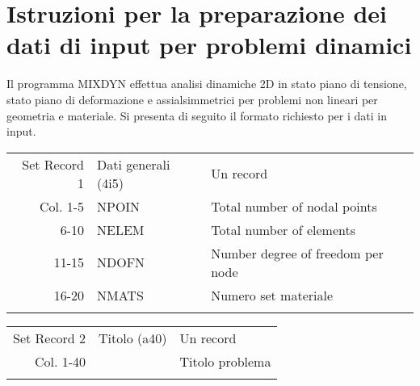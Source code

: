 \appendix
\chapter{Istruzioni per la preparazione dei dati di input per problemi dinamici }
Il programma MIXDYN effettua analisi dinamiche 2D in stato piano di tensione, stato piano di deformazione e assialsimmetrici per problemi non lineari per geometria e materiale. Si presenta di seguito il formato richiesto per i dati in input.

\begin{tabular}{rll}
	Set Record 1 & Dati generali (4i5)            & Un record                                         \\
	Col.  1-5    & NPOIN                          & Total number of nodal points                      \\
	6-10         & NELEM                          & Total number of elements                          \\
	11-15        & NDOFN                          & Number degree of freedom per node                 \\
	16-20        & NMATS                          & Numero set materiale                              \\
	             &                                &                                                   \\	             
\end{tabular}

\begin{tabular}{rll}
	Set Record 2 & Titolo (a40)                   & Un record                                         \\
	Col. 1-40    &                                & Titolo problema     	                          \\
	             &                                &                                                   \\	             
\end{tabular}

